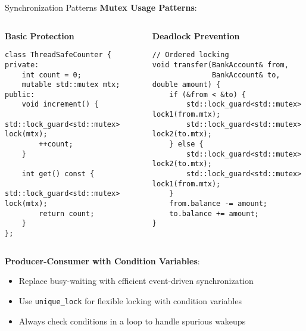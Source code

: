 \begin{frame}[fragile]{ Synchronization Patterns}
	\textbf{Mutex Usage Patterns}:
	\begin{columns}
		\begin{column}{0.5\textwidth}
			\textbf{Basic Protection}
			\begin{verbatim}
class ThreadSafeCounter {
private:
    int count = 0;
    mutable std::mutex mtx;
public:
    void increment() {
        std::lock_guard<std::mutex> lock(mtx);
        ++count;
    }

    int get() const {
        std::lock_guard<std::mutex> lock(mtx);
        return count;
    }
};
			\end{verbatim}
		\end{column}
		\begin{column}{0.5\textwidth}
			\textbf{Deadlock Prevention}
			\begin{verbatim}
// Ordered locking
void transfer(BankAccount& from,
              BankAccount& to, double amount) {
    if (&from < &to) {
        std::lock_guard<std::mutex> lock1(from.mtx);
        std::lock_guard<std::mutex> lock2(to.mtx);
    } else {
        std::lock_guard<std::mutex> lock2(to.mtx);
        std::lock_guard<std::mutex> lock1(from.mtx);
    }
    from.balance -= amount;
    to.balance += amount;
}
			\end{verbatim}
		\end{column}
	\end{columns}

	\vspace{1em}
	\textbf{Producer-Consumer with Condition Variables}:
	\begin{itemize}
		\item Replace busy-waiting with efficient event-driven synchronization
		\item Use \texttt{unique\_lock} for flexible locking with condition variables
		\item Always check conditions in a loop to handle spurious wakeups
	\end{itemize}
\end{frame}

